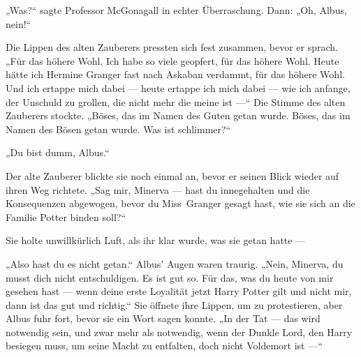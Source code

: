 „Was?“ sagte Professor McGonagall in echter Überraschung. Dann:
„Oh, Albus, nein!“

Die Lippen des alten Zauberers pressten sich fest zusammen, bevor er sprach.
„Für das höhere Wohl. Ich habe so viele geopfert, für das höhere Wohl. Heute hätte ich Hermine Granger fast nach Askaban verdammt, für das höhere Wohl. Und ich ertappe mich dabei — heute ertappe ich mich dabei — wie ich anfange, der Unschuld zu grollen, die nicht mehr die meine ist —“
Die Stimme des alten Zauberers stockte.
„Böses, das im Namen des Guten getan wurde. Böses, das im Namen des Bösen getan wurde. Was ist schlimmer?“

„Du bist dumm, Albus.“

Der alte Zauberer blickte sie noch einmal an, bevor er seinen Blick wieder auf ihren Weg richtete.
„Sag mir, Minerva — hast du innegehalten und die Konsequenzen abgewogen, bevor du Miss~Granger gesagt hast, wie sie sich an die Familie Potter binden soll?“

Sie holte unwillkürlich Luft, als ihr klar wurde, was sie getan hatte —

„Also hast du es nicht getan.“ Albus’ Augen waren traurig.
„Nein, Minerva, du musst dich nicht entschuldigen. Es ist gut so. Für das, was du heute von mir gesehen hast — wenn deine erste Loyalität jetzt Harry Potter gilt und nicht mir, dann ist das gut und richtig.“
Sie öffnete ihre Lippen, um zu protestieren, aber Albus fuhr fort, bevor sie ein Wort sagen konnte.
„In der Tat — das wird notwendig sein, und zwar mehr als notwendig, wenn der Dunkle Lord, den Harry besiegen muss, um seine Macht zu entfalten, doch nicht Voldemort ist —“

